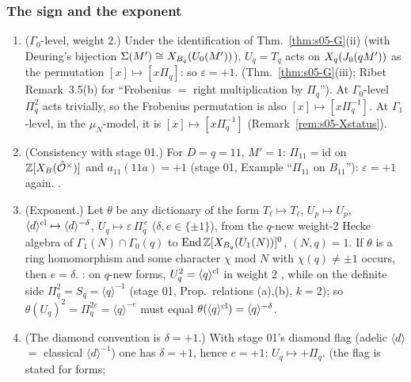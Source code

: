 \subsubsection{The sign and the exponent}
\begin{proposition}[$\varepsilon=+1$; exponent $+1$]\label{prop:s05-sign}
\begin{enumerate}[label=(\alph*)]
\item ($\Gamma_0$-level, weight $2$.) Under the identification of Thm.~\ref{thm:s05-G}(ii) (with Deuring's bijection
  $\Sigma(M')\cong X_{B_q}(U_0(M'))$), $U_q=T_q$ acts on $X_q(J_0(qM'))$ as the permutation $[x]\mapsto[x\Pi_q]$: so
  $\varepsilon=+1$. \stpmc{} (Thm.~\ref{thm:s05-G}(iii); Ribet Remark~3.5(b) for ``Frobenius $=$ right multiplication by $\Pi_q$'').
  At $\Gamma_0$-level $\Pi_q^2$ acts trivially, so the Frobenius permutation is also $[x]\mapsto[x\Pi_q^{-1}]$. At $\Gamma_1$-level,
  in the $\mu_N$-model, it is $[x]\mapsto[x\Pi_q^{-1}]$ \stexp{} (Remark~\ref{rem:s05-Xstatus}).
\item (Consistency with stage 01.) For $D=q=11$, $M'=1$: $\Pi_{11}=\mathrm{id}$ on $\mathbb{Z}[X_B(\hat{\mathcal{O}}^\times)]$ and $a_{11}(11a)=+1$
  (stage 01, Example ``$\Pi_{11}$ on $B_{11}$''): $\varepsilon=+1$ again. \stproved.
\item (Exponent.) Let $\theta$ be any dictionary of the form $T_\ell\mapsto T_\ell$, $U_p\mapsto U_p$,
  $\langle d\rangle^{\rm cl}\mapsto\langle d\rangle^{-\delta}$, $U_q\mapsto\varepsilon\,\Pi_q^{\,e}$ ($\delta,e\in\{\pm1\}$), from the
  $q$-new weight-$2$ Hecke algebra of $\Gamma_1(N)\cap\Gamma_0(q)$ to $\operatorname{End}\mathbb{Z}[X_{B_q}(U_1(N))]^0$, $(N,q)=1$. If $\theta$ is a ring
  homomorphism and some character $\chi$ mod $N$ with $\chi(q)\ne\pm1$ occurs, then $e=\delta$. \stpmc: on $q$-new forms,
  $U_q^2=\langle q\rangle^{\rm cl}$ in weight $2$ , while on the definite side $\Pi_q^2=S_q=\langle q\rangle^{-1}$ (stage 01,
  Prop.~relations (a),(b), $k=2$); so $\theta(U_q)^2=\Pi_q^{2e}=\langle q\rangle^{-e}$ must equal
  $\theta(\langle q\rangle^{\rm cl})=\langle q\rangle^{-\delta}$.
\item (The diamond convention is $\delta=+1$.) With stage 01's diamond flag (adelic $\langle d\rangle$ $=$ classical
  $\langle d\rangle^{-1}$) one has $\delta=+1$, hence $e=+1$: $U_q\mapsto+\Pi_q$. \sttoprove{} (the flag is stated for forms;

\end{enumerate}
\end{proposition}
